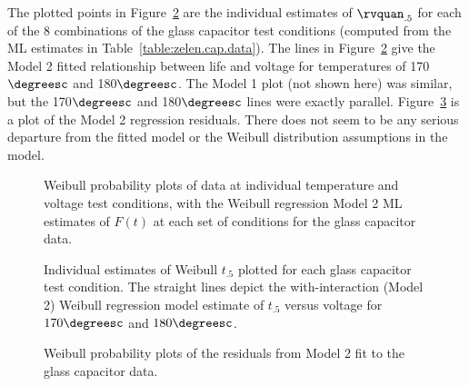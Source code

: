 \begin{example}
The plotted points in Figure~\ref{figure:zelencap.cellquan.int.ps}
are the individual estimates of $\rvquan_{.5}$ for each of the 8
combinations of the glass capacitor test conditions (computed from
the ML estimates in Table~\ref{table:zelen.cap.data}). The lines in
Figure~\ref{figure:zelencap.cellquan.int.ps} give the Model 2 fitted
relationship between life and voltage for temperatures of
170$\degreesc$ and 180$\degreesc$. The Model 1 plot (not shown here)
was similar, but the 170$\degreesc$ and 180$\degreesc$ lines were
exactly parallel.  Figure~\ref{figure:zelencap.groupm.int.resid.ps}
is a plot of the Model 2 regression residuals. There does not seem
to be any serious departure from the fitted model or the Weibull
distribution assumptions in the model.
\begin{figure}
\caption{Weibull probability plots of data
at individual temperature and voltage test conditions, with the
Weibull regression Model 2 ML estimates of $F(t)$ at each set of
conditions for the glass capacitor
data.}
\label{figure:zelencap.groupm.int.ps}
\end{figure}
\begin{figure}
\caption{Individual estimates of Weibull $t_{.5}$ plotted for 
each glass capacitor test condition. The
straight lines depict the with-interaction (Model 2) 
Weibull regression model estimate of $t_{.5}$
versus voltage for $170\degreesc$ and 
$180\degreesc$.}
\label{figure:zelencap.cellquan.int.ps}
\end{figure}
\begin{figure}
\caption{Weibull probability plots of the
residuals from Model 2 fit to the glass capacitor
data.}
\label{figure:zelencap.groupm.int.resid.ps}
\end{figure}
\end{example}

